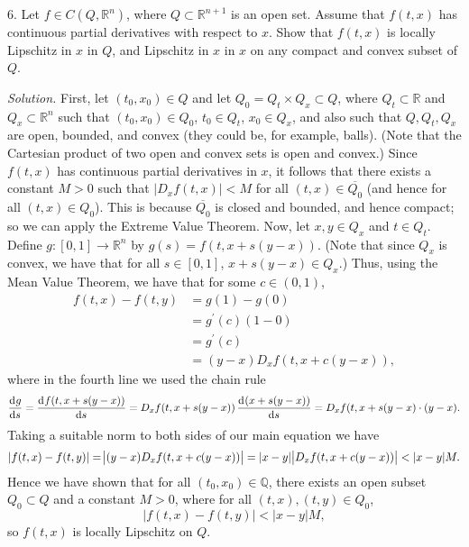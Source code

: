 \documentclass{article}
\newcommand{\Q}{\mathbb{Q}}
\newcommand{\R}{\mathbb{R}}
\begin{document}
\newpage

6. Let $f \in C(Q, \R^n)$, where $Q \subset \R^{n + 1}$ is an open set. Assume
that $f(t, x)$ has continuous partial derivatives with respect to $x$. Show that
$f(t, x)$ is locally Lipschitz in $x$ in $Q$, and Lipschitz in $x$ in $x$ on any compact
and convex subset of $Q$.

\textit{Solution.}
First, let $(t_0, x_0) \in Q$ and let $Q_0 = Q_t \times Q_x \subset Q$,
where $Q_t \subset \R$ and $Q_x \subset \R^n$ such that $(t_0, x_0) \in Q_0$,
$t_0 \in Q_t$, $x_0 \in Q_x$, and also such that $Q, Q_t, Q_x$ are open, bounded,
and convex (they could be, for example, balls).
(Note that the Cartesian product of two open and convex sets is open and convex.)
Since $f(t, x)$ has continuous partial derivatives in $x$, it follows that
there exists a constant $M > 0$ such that $|D_x f(t, x)| < M$
for all $(t, x) \in \overline{Q_0}$ (and hence for all $(t, x) \in Q_0$).
This is because $\overline{Q_0}$ is closed and bounded, and hence compact;
so we can apply the Extreme Value Theorem.
Now, let $x, y \in Q_x$ and $t \in Q_t$. Define $g: [0, 1] \to \R^n$
by $g(s) = f(t, x + s(y - x))$. (Note that since $Q_x$ is convex, we have
that for all $s \in [0, 1]$, $x + s(y - x) \in Q_x$.) Thus, using the
Mean Value Theorem, we have that for some $c \in (0, 1)$,
%
\begin{align*}
    f(t, x) - f(t, y)
        &= g(1) - g(0) \\
        &= g^\prime(c) (1 - 0) \\
        &= g^\prime(c) \\
        &= (y - x) D_x f(t, x + c(y - x))
        ,
\end{align*}
%
where in the fourth line we used the chain rule
%
\begin{equation*}
    \dod{g}{s} = \dod{f(t, x + s(y - x))}{s} = D_x f(t, x + s(y - x)) \dod{(x + s(y - x))}{s} = D_x f(t, x+ s(y - x) \cdot (y - x)
    .
\end{equation*}
%
Taking a suitable norm to both sides of our main equation we have
%
\begin{equation*}
    |f(t, x) - f(t, y)|
        = \envert{(y - x) D_x f(t, x + c(y - x))}
        = |x - y| \envert{D_x f(t, x + c(y - x))}
        < |x - y| M
        .
\end{equation*}
%
Hence we have shown that for all $(t_0, x_0) \in \Q$, there exists an open subset $Q_0 \subset Q$
and a constant $M > 0$, where for all $(t, x), (t, y) \in Q_0$,
%
\begin{equation*}
    |f(t, x) - f(t, y)| < |x - y| M
    ,
\end{equation*}
%
so $f(t, x)$ is locally Lipschitz on $Q$.
\end{document}

